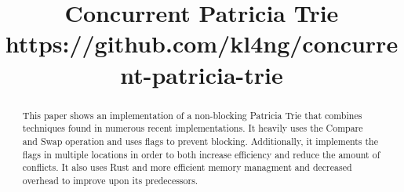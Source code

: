 \documentclass[conference]{IEEEtran}
\begin{document}
\title{Concurrent Patricia Trie \\ \normalsize https://github.com/kl4ng/concurrent-patricia-trie}

\author{
\and
{}
}

\maketitle


\begin{abstract}
This paper shows an implementation of a non-blocking Patricia Trie that combines techniques found in numerous recent implementations. It heavily uses the Compare and Swap operation and uses flags to prevent blocking. Additionally, it implements the flags in multiple locations in order to both increase efficiency and reduce the amount of conflicts. It also uses Rust and more efficient memory managment and decreased overhead to improve upon its predecessors. 
\end{abstract}
\end{document}

